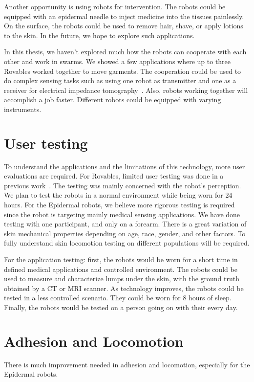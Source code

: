 Another opportunity is using robots for intervention. The robots could be equipped with an epidermal needle to inject medicine into the tissues painlessly. On the surface, the robots could be used to remove hair, shave, or apply lotions to the skin. In the future, we hope to explore such applications. 

In this thesis, we haven't explored much how the robots can cooperate with each other and work in swarms. We showed a few applications where up to three Rovables worked together to move garments. The cooperation could be used to do complex sensing tasks such as using one robot as transmitter and one as a receiver for electrical impedance tomography~\cite{cheney1999electrical}. Also, robots working together will accomplish a job faster. Different robots could be equipped with varying instruments. 

\section{User testing}
To understand the applications and the limitations of this technology, more user evaluations are required. For Rovables, limited user testing was done in a previous work~\cite{kao2017exploring}. The testing was mainly concerned with the robot's perception. We plan to test the robots in a normal environment while being worn for 24 hours. 
For the Epidermal robots, we believe more rigorous testing is required since the robot is targeting mainly medical sensing applications. We have done testing with one participant, and only on a forearm. There is a great variation of skin mechanical properties depending on age, race, gender, and other factors. To fully understand skin locomotion testing on different populations will be required. 

For the application testing: first, the robots would be worn for a short time in defined medical applications and controlled environment. The robots could be used to measure and characterize lumps under the skin, with the ground truth obtained by a CT or MRI scanner. As technology improves, the robots could be tested in a less controlled scenario. They could be worn for 8 hours of sleep. Finally, the robots would be tested on a person going on with their every day. 

\section{Adhesion and Locomotion}
There is much improvement needed in adhesion and locomotion, especially for the Epidermal robots. 

